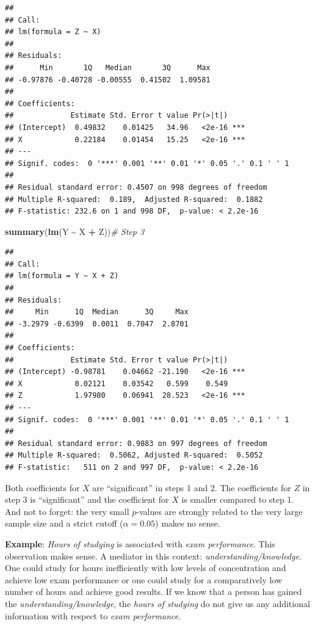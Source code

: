 \documentclass[
]{book}
\newenvironment{Shaded}{\begin{snugshade}}{\end{snugshade}}
\newcommand{\CommentTok}[1]{\textcolor[rgb]{0.56,0.35,0.01}{\textit{#1}}}
\newcommand{\FunctionTok}[1]{\textcolor[rgb]{0.13,0.29,0.53}{\textbf{#1}}}
\newcommand{\NormalTok}[1]{#1}
\newcommand{\SpecialCharTok}[1]{\textcolor[rgb]{0.81,0.36,0.00}{\textbf{#1}}}
\begin{document}
\begin{verbatim}
## 
## Call:
## lm(formula = Z ~ X)
## 
## Residuals:
##      Min       1Q   Median       3Q      Max 
## -0.97876 -0.40728 -0.00555  0.41502  1.09581 
## 
## Coefficients:
##             Estimate Std. Error t value Pr(>|t|)    
## (Intercept)  0.49832    0.01425   34.96   <2e-16 ***
## X            0.22184    0.01454   15.25   <2e-16 ***
## ---
## Signif. codes:  0 '***' 0.001 '**' 0.01 '*' 0.05 '.' 0.1 ' ' 1
## 
## Residual standard error: 0.4507 on 998 degrees of freedom
## Multiple R-squared:  0.189,  Adjusted R-squared:  0.1882 
## F-statistic: 232.6 on 1 and 998 DF,  p-value: < 2.2e-16
\end{verbatim}

\begin{Shaded}
\begin{Highlighting}[]
\FunctionTok{summary}\NormalTok{(}\FunctionTok{lm}\NormalTok{(Y }\SpecialCharTok{\textasciitilde{}}\NormalTok{ X }\SpecialCharTok{+}\NormalTok{ Z))}\CommentTok{\# Step 3}
\end{Highlighting}
\end{Shaded}

\begin{verbatim}
## 
## Call:
## lm(formula = Y ~ X + Z)
## 
## Residuals:
##     Min      1Q  Median      3Q     Max 
## -3.2979 -0.6399  0.0011  0.7047  2.8701 
## 
## Coefficients:
##             Estimate Std. Error t value Pr(>|t|)    
## (Intercept) -0.98781    0.04662 -21.190   <2e-16 ***
## X            0.02121    0.03542   0.599    0.549    
## Z            1.97980    0.06941  28.523   <2e-16 ***
## ---
## Signif. codes:  0 '***' 0.001 '**' 0.01 '*' 0.05 '.' 0.1 ' ' 1
## 
## Residual standard error: 0.9883 on 997 degrees of freedom
## Multiple R-squared:  0.5062, Adjusted R-squared:  0.5052 
## F-statistic:   511 on 2 and 997 DF,  p-value: < 2.2e-16
\end{verbatim}

Both coefficients for \(X\) are ``significant'' in steps 1 and 2.
The coefficients for \(Z\) in step 3 is ``significant'' and the coefficient for
\(X\) is smaller compared to step 1. And not to forget: the very small \(p\)-values are strongly
related to the very large sample size and a strict cutoff (\(\alpha = 0.05\)) makes no sense.

\textbf{Example}: \emph{Hours of studying} is associated with \emph{exam performance}.
This observation makes sense. A mediator in this context: \emph{understanding/knowledge}.
One could study for hours inefficiently with low levels of concentration
and achieve low exam performance or one could study for a comparatively
low number of hours and achieve good results. If we know that a person has gained the
\emph{understanding/knowledge}, the \emph{hours of studying} do not give us any additional
information with respect to \emph{exam performance}.
\end{document}
